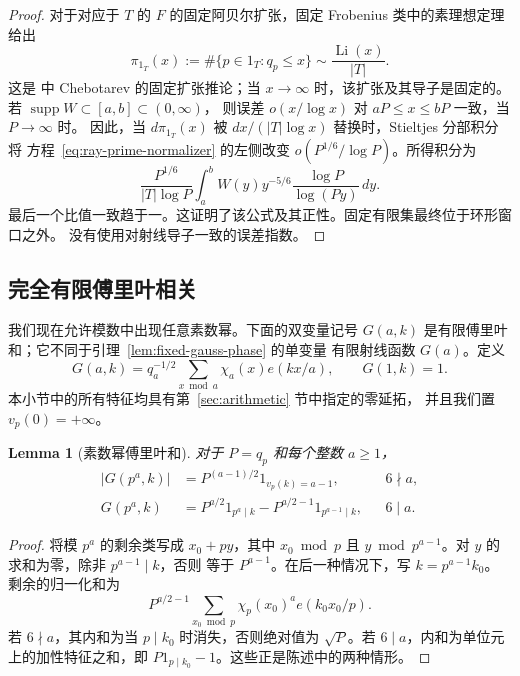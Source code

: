 \documentclass[11pt,a4paper]{article}
\numberwithin{equation}{section}
\numberwithin{figure}{section}
\newtheorem{lemma}[theorem]{Lemma}
\theoremstyle{definition}
\theoremstyle{remark}
\begin{document}
\begin{proof}
对于对应于 $T$ 的 $F$ 的固定阿贝尔扩张，固定 Frobenius 类中的素理想定理给出
\[
 \pi_{1_T}(x):=\#\{p\in1_T:q_p\le x\}
       \sim\frac{\operatorname{Li}(x)}{|T|}.
\]
这是 \cite[Theorem 1.1]{TZ} 中 Chebotarev 的固定扩张推论；当
$x\to\infty$ 时，该扩张及其导子是固定的。若 $\operatorname{supp}W\subset[a,b]\subset(0,\infty)$，
则误差 $o(x/\log x)$ 对 $aP\le x\le bP$ 一致，当 $P\to\infty$ 时。
因此，当 $d\pi_{1_T}(x)$ 被 $dx/(|T|\log x)$ 替换时，Stieltjes 分部积分将
方程~\eqref{eq:ray-prime-normalizer} 的左侧改变 $o(P^{1/6}/\log P)$。所得积分为
\[
 \frac{P^{1/6}}{|T|\log P}
 \int_a^b W(y)y^{-5/6}\frac{\log P}{\log(Py)}\,dy.
\]
最后一个比值一致趋于一。这证明了该公式及其正性。固定有限集最终位于环形窗口之外。
没有使用对射线导子一致的误差指数。
\end{proof}

\subsection{完全有限傅里叶相关}\label{sec:finite-correlations}

我们现在允许模数中出现任意素数幂。下面的双变量记号
$G(a,k)$ 是有限傅里叶和；它不同于引理~\ref{lem:fixed-gauss-phase} 的单变量
有限射线函数 $G(a)$。定义
\begin{equation}
 G(a,k)=q_a^{-1/2}\sum_{x\bmod a}\chi_a(x)e(kx/a),\qquad G(1,k)=1.
 \label{old-eq:2.4}
\end{equation}
本小节中的所有特征均具有第~\ref{sec:arithmetic} 节中指定的零延拓，
并且我们置 $v_p(0)=+\infty$。

\begin{lemma}[素数幂傅里叶和]\label{lem:prime-power-fourier}
对于 $P=q_p$ 和每个整数 $a\ge1$，
\begin{equation}
 \begin{aligned}
 |G(p^a,k)|&=P^{(a-1)/2}1_{v_p(k)=a-1},&&6\nmid a,\\
 G(p^a,k)&=P^{a/2}1_{p^a\mid k}
             -P^{a/2-1}1_{p^{a-1}\mid k},&&6\mid a.
 \end{aligned}
 \label{eq:gauss-local}
\end{equation}
\end{lemma}

\begin{proof}
将模 $p^a$ 的剩余类写成 $x_0+py$，其中 $x_0\bmod p$ 且
$y\bmod p^{a-1}$。对 $y$ 的求和为零，除非 $p^{a-1}\mid k$，否则
等于 $P^{a-1}$。在后一种情况下，写 $k=p^{a-1}k_0$。
剩余的归一化和为
\[
 P^{a/2-1}\sum_{x_0\bmod p}\chi_p(x_0)^a e(k_0x_0/p).
\]
若 $6\nmid a$，其内和为当 $p\mid k_0$ 时消失，否则绝对值为 $\sqrt P$。若 $6\mid a$，内和为单位元上的加性特征之和，即 $P1_{p\mid k_0}-1$。这些正是陈述中的两种情形。
\end{proof}
\end{document}
